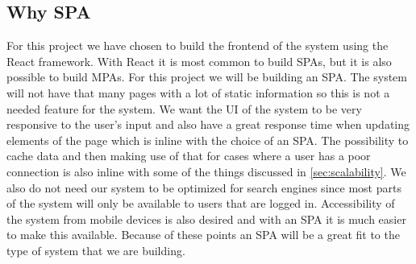 \subsection{Why SPA}
For this project we have chosen to build the frontend of the system using the React framework. 
With React it is most common to build SPAs, but it is also possible to build MPAs. 
For this project we will be building an SPA.
The system will not have that many pages with a lot of static information so this is not a needed feature for the system.
We want the UI of the system to be very responsive to the user's input and also have a great response time when updating elements of the page which is inline with the choice of an SPA.
The possibility to cache data and then making use of that for cases where a user has a poor connection is also inline with some of the things discussed in \autoref{sec:scalability}.
We also do not need our system to be optimized for search engines since most parts of the system will only be available to users that are logged in.
Accessibility of the system from mobile devices is also desired and with an SPA it is much easier to make this available. 
Because of these points an SPA will be a great fit to the type of system that we are building.
